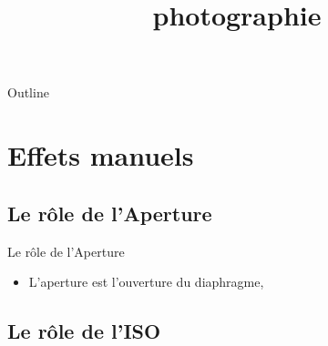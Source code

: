 \documentclass{beamer}
\title{ photographie }
\begin{document}
 

 
 \begin{frame} 
   \titlepage 
 \end{frame} 
 
 \begin{frame}{Outline} 
 \tableofcontents 
 \end{frame} 

\section{ Effets manuels } 
\subsection{Le rôle de l'Aperture} 

\begin{frame}{Le rôle de l'Aperture}{}
   \begin{itemize} 
      \item { 
         L'aperture est l'ouverture du diaphragme, 
      } 
   \end{itemize} 
 \end{frame}

\subsection{Le rôle de l'ISO} 
\end{document}
